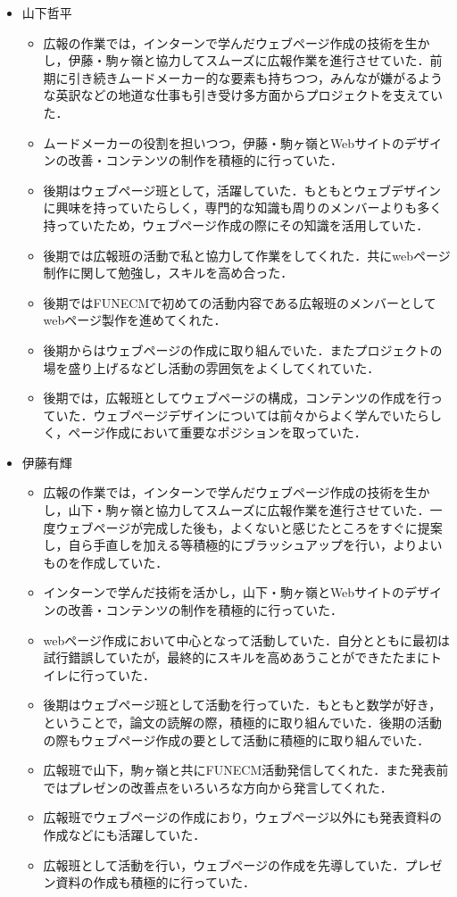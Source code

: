 \documentclass[openany,11pt,papersize]{jsbook}
\begin{document}
\begin{itemize}
\item 山下哲平
\begin{itemize}
\item 広報の作業では，インターンで学んだウェブページ作成の技術を生かし，伊藤・駒ヶ嶺と協力してスムーズに広報作業を進行させていた．前期に引き続きムードメーカー的な要素も持ちつつ，みんなが嫌がるような英訳などの地道な仕事も引き受け多方面からプロジェクトを支えていた．
\item ムードメーカーの役割を担いつつ，伊藤・駒ヶ嶺とWebサイトのデザインの改善・コンテンツの制作を積極的に行っていた．
\item 後期はウェブページ班として，活躍していた．もともとウェブデザインに興味を持っていたらしく，専門的な知識も周りのメンバーよりも多く持っていたため，ウェブページ作成の際にその知識を活用していた．
\item 後期では広報班の活動で私と協力して作業をしてくれた．共にwebページ制作に関して勉強し，スキルを高め合った．
\item 後期ではFUNECMで初めての活動内容である広報班のメンバーとしてwebページ製作を進めてくれた．
\item 後期からはウェブページの作成に取り組んでいた．またプロジェクトの場を盛り上げるなどし活動の雰囲気をよくしてくれていた．
\item 後期では，広報班としてウェブページの構成，コンテンツの作成を行っていた．ウェブページデザインについては前々からよく学んでいたらしく，ページ作成において重要なポジションを取っていた．
\end{itemize}

\item 伊藤有輝
\begin{itemize}
\item 広報の作業では，インターンで学んだウェブページ作成の技術を生かし，山下・駒ヶ嶺と協力してスムーズに広報作業を進行させていた．一度ウェブページが完成した後も，よくないと感じたところをすぐに提案し，自ら手直しを加える等積極的にブラッシュアップを行い，よりよいものを作成していた．
\item インターンで学んだ技術を活かし，山下・駒ヶ嶺とWebサイトのデザインの改善・コンテンツの制作を積極的に行っていた．
\item webページ作成において中心となって活動していた．自分とともに最初は試行錯誤していたが，最終的にスキルを高めあうことができたたまにトイレに行っていた．
\item 後期はウェブページ班として活動を行っていた．もともと数学が好き，ということで，論文の読解の際，積極的に取り組んでいた．後期の活動の際もウェブページ作成の要として活動に積極的に取り組んでいた．
\item 広報班で山下，駒ヶ嶺と共にFUNECM活動発信してくれた．また発表前ではプレゼンの改善点をいろいろな方向から発言してくれた．
\item 広報班でウェブページの作成におり，ウェブページ以外にも発表資料の作成などにも活躍していた．
\item 広報班として活動を行い，ウェブページの作成を先導していた．プレゼン資料の作成も積極的に行っていた．
\end{itemize}


\end{itemize}
\end{document}

